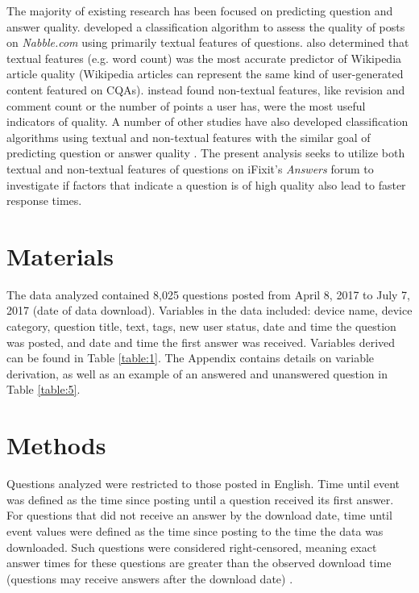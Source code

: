 \documentclass[]{interact}\usepackage[]{graphicx}\usepackage[]{color}
\begin{document}
The majority of existing research has been focused on predicting question and answer quality. \cite{Weimer2007} developed a classification algorithm to assess the quality of posts on \textit{Nabble.com} using primarily textual features of questions. \cite{Blumenstock2008} also determined that textual features (e.g. word count) was the most accurate predictor of Wikipedia article quality (Wikipedia articles can represent the same kind of user-generated content featured on CQAs). \cite{Fu2015} instead found non-textual features, like revision and comment count or the number of points a user has, were the most useful indicators of quality. A number of other studies have also developed classification algorithms using textual and non-textual features with the similar goal of predicting question or answer quality \cite{Yao2015, Toba2014, Ponzanelli2014a, Ravi2014}. The present analysis seeks to utilize both textual and non-textual features of questions on iFixit's \textit{Answers} forum to investigate if factors that indicate a question is of high quality also lead to faster response times.


\section{Materials}

The data analyzed contained 8,025 questions posted from April 8, 2017 to July 7, 2017 (date of data download). Variables in the data included: device name, device category, question title, text, tags, new user status, date and time the question was posted, and date and time the first answer was received. Variables derived can be found in Table \ref{table:1}. The Appendix contains details on variable derivation, as well as an example of an answered and unanswered question in Table \ref{table:5}. 


\section{Methods}

Questions analyzed were restricted to those posted in English. Time until event was defined as the time since posting until a question received its first answer. For questions that did not receive an answer by the download date, time until event values were defined as the time since posting to the time the data was downloaded. Such questions were considered right-censored, meaning exact answer times for these questions are greater than the observed download time (questions may receive answers after the download date) \cite{Kleinbaum2011}. 
\end{document}
